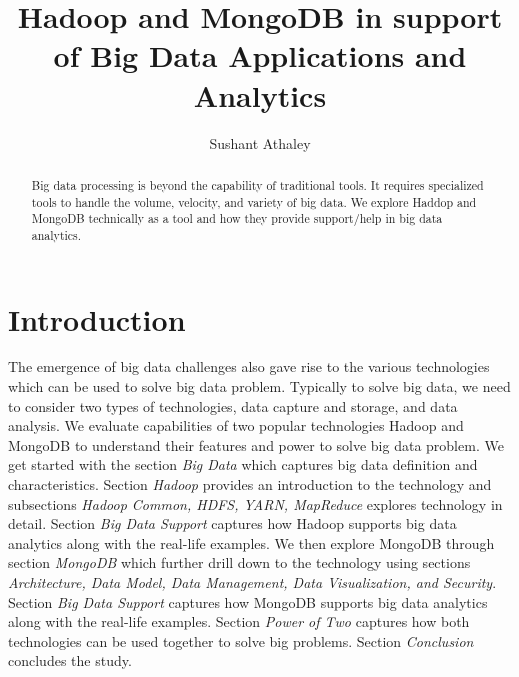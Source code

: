 \documentclass[sigconf]{acmart}
\begin{document}
\title{Hadoop and MongoDB in support of Big Data Applications and Analytics}


\author{Sushant Athaley}

\renewcommand{\shortauthors}{G. v. Laszewski}


\begin{abstract}
Big data processing is beyond the capability of traditional tools. It requires specialized tools to handle the volume, velocity, and variety of big data. We explore Haddop and MongoDB technically as a tool and how they provide support/help in big data analytics.

\end{abstract}


\maketitle

\section{Introduction}
The emergence of big data challenges also gave rise to the various technologies which can be used to solve big data problem. Typically to solve big data, we need to consider two types of technologies, data capture and storage, and data analysis. We evaluate capabilities of two popular technologies Hadoop and MongoDB to understand their features and power to solve big data problem. We get started with the section \emph{Big Data} which captures big data definition and characteristics. Section \emph{Hadoop} provides an introduction to the technology and subsections \emph{Hadoop Common, HDFS, YARN, MapReduce} explores technology in detail. Section \emph{Big Data Support} captures how Hadoop supports big data analytics along with the real-life examples. We then explore MongoDB through section \emph{MongoDB} which further drill down to the technology using sections \emph{Architecture, Data Model, Data Management, Data Visualization, and Security}. Section \emph{Big Data Support} captures how MongoDB supports big data analytics along with the real-life examples. Section \emph{Power of Two} captures how both technologies can be used together to solve big problems. Section \emph{Conclusion} concludes the study. 
\end{document}
